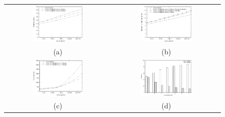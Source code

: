 \documentclass[acmtocl]{acmtrans2m}
\begin{document}
\begin{figure}
\centering
\begin{tabular}{cc}
\includegraphics[width=0.5\textwidth]{plots/heapsort_branch_counts.eps} & \includegraphics[width=0.5\textwidth]{plots/heapsort_branch_misses.eps}\\
(a) & (b) \\
\includegraphics[width=0.5\textwidth]{plots/heapsort_cycle_counts.eps} & \includegraphics[width=0.5\textwidth]{plots/heapsort_8heap_branches.eps} \\
(c) & (d) \\
\end{tabular}

\end{figure}
\end{document}
